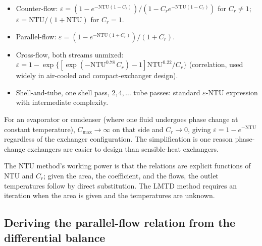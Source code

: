 \begin{itemize}[leftmargin=*]
  \item Counter-flow: $\varepsilon = (1 - e^{-\text{NTU}(1 - C_r)})/
    (1 - C_r e^{-\text{NTU}(1 - C_r)})$ for $C_r \neq 1$; $\varepsilon
    = \text{NTU}/(1 + \text{NTU})$ for $C_r = 1$.
  \item Parallel-flow: $\varepsilon = (1 - e^{-\text{NTU}(1 + C_r)})/
    (1 + C_r)$.
  \item Cross-flow, both streams unmixed: $\varepsilon = 1 - \exp\{
    [\exp(-\text{NTU}^{0.78}\,C_r) - 1]\text{NTU}^{0.22}/C_r\}$
    (correlation, used widely in air-cooled and compact-exchanger
    design).
  \item Shell-and-tube, one shell pass, $2,4,\ldots$ tube passes:
    standard $\varepsilon$-NTU expression with intermediate complexity.
\end{itemize}



For an evaporator or condenser (where one fluid undergoes phase
change at constant temperature), $C_{\max} \to \infty$ on that side
and $C_r \to 0$, giving $\varepsilon = 1 - e^{-\text{NTU}}$ regardless
of the exchanger configuration. The simplification is one reason
phase-change exchangers are easier to design than sensible-heat
exchangers.

The NTU method's working power is that the relations are explicit
functions of NTU and $C_r$; given the area, the coefficient, and the
flows, the outlet temperatures follow by direct substitution. The
LMTD method requires an iteration when the area is given and the
temperatures are unknown.

\subsection{Deriving the parallel-flow relation from the differential balance}


